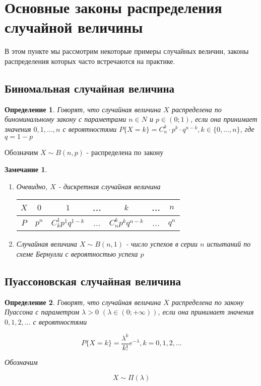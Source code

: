 \documentclass[a4paper, 14pt]{report}
\newtheorem{defenition}{Определение}[section]
\newtheorem{note}{Замечание}[section]
\begin{document}
\section{Основные законы распределения случайной величины}

В этом пункте мы рассмотрим некоторые примеры случайных величин, законы распределения которых часто встречаются на практике.

\subsection{Биномальная случайная величина}

\begin{defenition}
    Говорят, что случайная величина $X$ распределена по биноминальному закону с параметрами $n \in N$ и $p \in (0;1)$, если она принимает значения $0,1,...,n$ с вероятностями $P\{X = k\} = C_n^k \cdot p^k \cdot q^{n-k}, k \in \{0,...,n\}$, где $q = 1-p$
\end{defenition}

Обозначим $X \sim B(n,p)$ - распределена по закону

\begin{note}
    \begin{enumerate}
        \item Очевидно, $X$ - дискретная случайная величина

        \begin{tabular}{|c||c|c|c|c|c|c|}
            \hline
            $X$ & $0$ & $1$ & ... & $k$ & ... & $n$ \\
            \hline
            $P$ & $p^n$ & $C_k^1p^1q^{1-k}$ & ... & $C_n^kp^kq^{n-k}$ & ... & $q^n$ \\
            \hline
        \end{tabular}

    \item Случайная величина $X \sim B(n,1)$ - число успехов в серии $n$ испытаний по схеме Бернулли с вероятностью успеха $p$
    \end{enumerate}
\end{note}

\subsection{Пуассоновская случайная величина}

\begin{defenition}
    Говорят, что случайная величина $X$ распределена по закону Пуассона с параметром $\lambda > 0$ $(\lambda \in (0; + \infty))$, если она принимает значения $0,1,2,...$ с вероятностями

    $$
    P\{X=k\} = \frac{\lambda^k}{k!}e^{-\lambda}, k = 0, 1, 2, ...
    $$

    Обозначим

    $$
    X \sim \Pi(\lambda)
    $$
\end{defenition}
\end{document}

